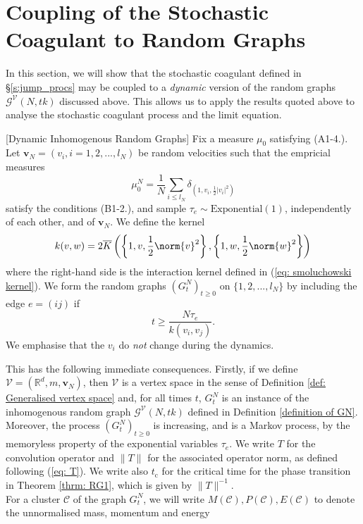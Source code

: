 \section{Coupling of the Stochastic Coagulant to Random Graphs} \label{sec: coupling_to_random_graph}
In this section, we will show that the stochastic coagulant defined in \S\ref{s:jump_procs} may be coupled to a \emph{dynamic} version of the random graphs $\mathcal{G}^\mathcal{V}(N,tk)$ discussed above. This allows us to apply the results quoted above to analyse the stochastic coagulant process and the limit equation.
\begin{definition}\label{def: GNT}[Dynamic Inhomogenous Random Graphs] Fix a measure $\mu_0$ satisfying (A1-4.). Let $\mathbf{v}_N=(v_i, i=1,2,...,l_N)$ be random velocities such that the empricial measures \begin{equation} \mu^N_0=\frac{1}{N}\sum_{i\le l_N} \delta_{(1,v_i,\frac{1}{2}|v_i|^2)}\end{equation}  satisfy the conditions (B1-2.), and sample $\tau_e \sim \text{Exponential}(1)$, independently of each other, and of $\mathbf{v}_N$. We define the kernel \begin{equation} k(v,w)=2\overline{K}\left(\left\{1,v, \frac{1}{2}\norm{v}^2\right\},\left\{1,w, \frac{1}{2}\norm{w}^2\right\}\right) \end{equation} where the right-hand side is the interaction kernel defined in (\ref{eq: smoluchowski kernel}). We form the random graphs $(G^N_t)_{t \ge 0}$ on $\{1,2,...,l_N\}$ by including the edge $e=(ij)$ if \begin{equation}
    t\ge \frac{N \tau_e}{k(v_i,v_j)}.
\end{equation} We emphasise that the $v_i$ do \emph{not} change during the dynamics. \end{definition} This has the following immediate consequences. Firstly, if we define $ \mathcal{V}=(\mathbb{R}^d, m, \mathbf{v}_N)$, then $\mathcal{V}$ is a vertex space in the sense of Definition \ref{def: Generalised vertex space} and, for all times $t$, $G^N_t$ is an instance of the inhomogenous random graph $\mathcal{G}^{\mathcal{V}}(N, tk)$ defined in Definition \ref{definition of GN}. Moreover, the process $(G^N_t)_{t\ge 0}$ is increasing, and is a Markov process, by the memoryless property of the exponential variables $\tau_e$.  We write $T$ for the convolution operator and $\|T\|$ for the associated operator norm, as defined following (\ref{eq: T}). We write also $t_\mathrm{c}$ for the critical time for the phase transition in Theorem \ref{thrm: RG1}, which is given by $\|T\|^{-1}$. \medskip \\ For a cluster $\mathcal{C}$ of the graph $G^N_t$, we will write $M(\mathcal{C}), P(\mathcal{C}), E(\mathcal{C})$ to denote the unnormalised mass, momentum and energy \begin{equation}\label{eq: cluster quantities}

\end{equation}
